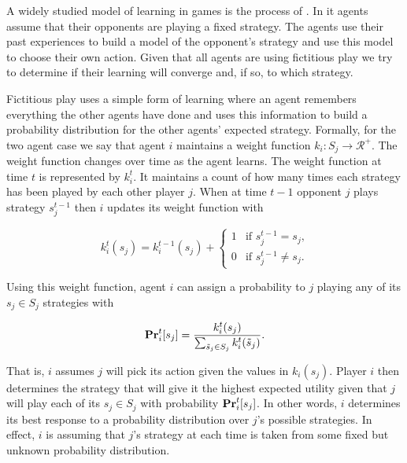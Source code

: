 A widely studied model of learning in games is the process of
. In it agents assume that their opponents are
playing a fixed strategy. The agents use their past experiences to
build a model of the opponent's strategy and use this model to choose
their own action. Given that all agents are using fictitious play we
try to determine if their learning will converge and, if so, to which
strategy.

Fictitious play uses a simple form of learning where an agent
remembers everything the other agents have done and uses this
information to build a probability distribution for the other agents'
expected strategy. Formally, for the two agent case we say that agent
$i$ maintains a weight function $k_i: S_{j} \rightarrow
\mathcal{R}^+$.  The weight function changes over time as the agent
learns. The weight function at time $t$ is represented by $k_i^t$. It
maintains a count of how many times each strategy has been played by
each other player $j$.  When at time $t-1$ opponent $j$ plays strategy
$s_j^{t-1}$ then $i$ updates its weight function with

\begin{equation}
  \label{eq:1}
  k_i^t(s_j) = k_i^{t-1}(s_j) + 
  \left\{
    \begin{array}{ll}
      1 & \mbox{if $s_j^{t-1} = s_j$,} \\
      0 & \mbox{if $s_j^{t-1} \neq s_j$.}
    \end{array}    
  \right.
\end{equation}

Using this weight function, agent $i$ can assign a probability to $j$
playing any of its $s_j \in S_j$ strategies with

\begin{equation}
  \label{eq:2}
  \mathbf{Pr}_i^t[s_j] = \frac{k_i^t(s_j)}{\sum_{\tilde{s}_j \in S_j} k_i^t(\tilde{s}_j)}.
\end{equation}


That is, $i$ assumes $j$ will pick its action 
given the values in $k_i(s_j)$. Player $i$ then determines the
strategy that will give it the highest expected utility given that $j$
will play each of its $s_j \in S_j$ with probability $\mathbf{Pr}_i^t[s_j]$.
In other words, $i$ determines its best response to a probability
distribution over $j$'s possible strategies.  In effect, $i$ is
assuming that $j$'s strategy at each time is taken from some fixed but
unknown probability distribution.

